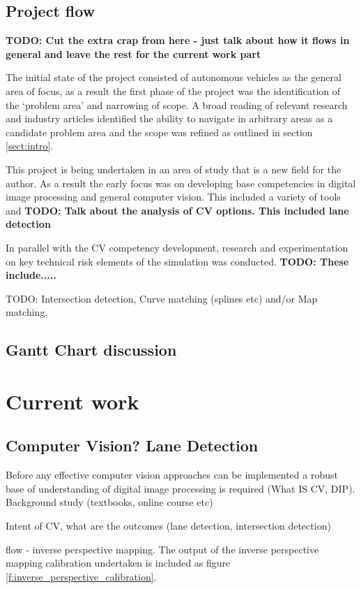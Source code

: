 \documentclass[]{aiaa-tc}%
\begin{document}
\subsection{Project flow}
\textbf{TODO: Cut the extra crap from here - just talk about how it flows in general and leave the rest for the current work part}

The initial state of the project consisted of autonomous vehicles as the general area of focus, as a result the first phase of the project was the identification of the `problem area' and narrowing of scope. A broad reading of relevant research and industry articles identified the ability to navigate in arbitrary areas as a candidate problem area and the scope was refined as outlined in section \ref{sect:intro}. 

This project is being undertaken in an area of study that is a new field for the author. As a result the early focus was on developing base competencies in digital image processing and general computer vision. This included a variety of tools and \textbf{TODO: Talk about the analysis of CV options. This included lane detection}

In parallel with the CV competency development, research and experimentation on key technical risk elements of the simulation was conducted. \textbf{TODO: These include.....}

TODO:  Intersection detection, Curve matching (splines etc) and/or Map matching, 

\subsection{Gantt Chart discussion}

\section{Current work}

\subsection{Computer Vision? Lane Detection}
Before any effective computer vision approaches can be implemented a robust base of understanding of digital image processing is required (What IS CV, DIP). Background study (textbooks, online course etc)

Intent of CV, what are the outcomes (lane detection, intersection detection)

flow - inverse perspective mapping. 
The output of the inverse perspective mapping calibration undertaken is included as figure \ref{f:inverse_perspective_calibration}.
\end{document}
